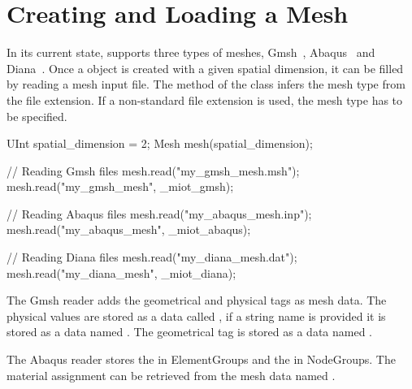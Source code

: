 \section{Creating and Loading a Mesh\label{sect:common:mesh}}

In its current state, \akantu supports three types of meshes, Gmsh~\cite{gmsh},
Abaqus~\cite{abaqus} and Diana~\cite{diana}. Once a  object is
created with a given spatial dimension, it can be filled by reading a mesh input file.
The method  of the class  infers the mesh type from the file extension. If a non-standard file extension is used, the mesh type has to be specified.

\begin{cpp}
UInt spatial_dimension = 2;
Mesh mesh(spatial_dimension);

// Reading Gmsh files
mesh.read("my_gmsh_mesh.msh");
mesh.read("my_gmsh_mesh", _miot_gmsh);


// Reading Abaqus files
mesh.read("my_abaqus_mesh.inp");
mesh.read("my_abaqus_mesh", _miot_abaqus);

// Reading Diana files
mesh.read("my_diana_mesh.dat");
mesh.read("my_diana_mesh", _miot_diana);
\end{cpp}

The Gmsh reader adds the geometrical and physical tags as mesh data. The physical
values are stored as a  data called , if a string
name is provided it is stored as a  data named
. The geometrical tag is stored as a  data named
.


The Abaqus reader stores the  in ElementGroups and the 
in NodeGroups. The material assignment can be retrieved from the
 mesh data named .


